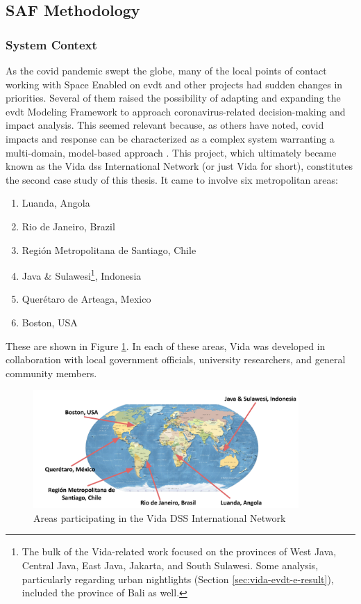 \subsection{SAF Methodology} \label{sec:vida-saf-method}

\subsubsection{System Context}

As the \ac{covid} pandemic swept the globe, many of the local points of contact working with Space Enabled on \ac{evdt} and other projects had sudden changes in priorities. Several of them raised the possibility of adapting and expanding the \ac{evdt} Modeling Framework to approach coronavirus-related decision-making and impact analysis. This seemed relevant because, as others have noted, \ac{covid} impacts and response can be characterized as a complex system warranting a multi-domain, model-based approach \cite{deweckHandlingCOVID192020}. This project,  which ultimately became known as the Vida \ac{dss} International Network (or just Vida for short), constitutes the second case study of this thesis. It came to involve six metropolitan areas:

\begin{enumerate}[itemsep=0pt,parsep=0pt]
    \item{Luanda, Angola}
    \item Rio de Janeiro, Brazil
    \item Región Metropolitana de Santiago, Chile
    \item{Java \& Sulawesi\footnote{The bulk of the Vida-related work focused on the provinces of West Java, Central Java, East Java, Jakarta, and South Sulawesi. Some analysis, particularly regarding urban nightlights (Section \ref{sec:vida-evdt-e-result}), included the province of Bali as well.}, Indonesia}
    \item{Querétaro de Arteaga, Mexico}
    \item{Boston, USA}
\end{enumerate}

These are shown in Figure \ref{fig:vida_map}. In each of these areas, Vida was developed in collaboration with local government officials, university researchers, and general community members. 

\begin{figure}[!htb]
	\centering
	\includegraphics[width=0.9\textwidth]{Figures/chap5/vida_map.png}
	\caption{Areas participating in the Vida DSS International Network}
	\label{fig:vida_map}
\end{figure}


